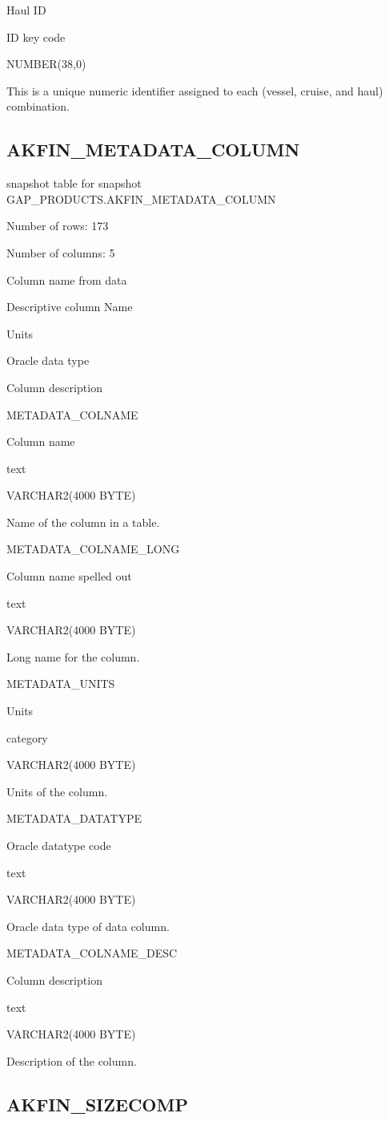 \documentclass[
  letterpaper,
  oneside,
  open=any]{scrbook}
\begin{document}
Haul ID

ID key code

NUMBER(38,0)

This is a unique numeric identifier assigned to each (vessel, cruise,
and haul) combination.

\subsection{AKFIN\_METADATA\_COLUMN}\label{akfin_metadata_column}

snapshot table for snapshot GAP\_PRODUCTS.AKFIN\_METADATA\_COLUMN

Number of rows: 173

Number of columns: 5

Column name from data

Descriptive column Name

Units

Oracle data type

Column description

METADATA\_COLNAME

Column name

text

VARCHAR2(4000 BYTE)

Name of the column in a table.

METADATA\_COLNAME\_LONG

Column name spelled out

text

VARCHAR2(4000 BYTE)

Long name for the column.

METADATA\_UNITS

Units

category

VARCHAR2(4000 BYTE)

Units of the column.

METADATA\_DATATYPE

Oracle datatype code

text

VARCHAR2(4000 BYTE)

Oracle data type of data column.

METADATA\_COLNAME\_DESC

Column description

text

VARCHAR2(4000 BYTE)

Description of the column.

\subsection{AKFIN\_SIZECOMP}\label{akfin_sizecomp}
\end{document}
